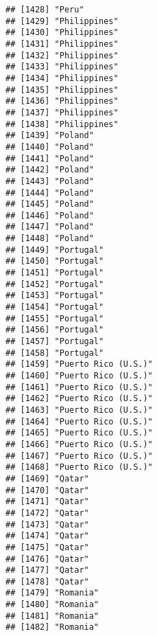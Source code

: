 \documentclass[]{article}
\begin{document}
\begin{verbatim}
## [1428] "Peru"                               
## [1429] "Philippines"                        
## [1430] "Philippines"                        
## [1431] "Philippines"                        
## [1432] "Philippines"                        
## [1433] "Philippines"                        
## [1434] "Philippines"                        
## [1435] "Philippines"                        
## [1436] "Philippines"                        
## [1437] "Philippines"                        
## [1438] "Philippines"                        
## [1439] "Poland"                             
## [1440] "Poland"                             
## [1441] "Poland"                             
## [1442] "Poland"                             
## [1443] "Poland"                             
## [1444] "Poland"                             
## [1445] "Poland"                             
## [1446] "Poland"                             
## [1447] "Poland"                             
## [1448] "Poland"                             
## [1449] "Portugal"                           
## [1450] "Portugal"                           
## [1451] "Portugal"                           
## [1452] "Portugal"                           
## [1453] "Portugal"                           
## [1454] "Portugal"                           
## [1455] "Portugal"                           
## [1456] "Portugal"                           
## [1457] "Portugal"                           
## [1458] "Portugal"                           
## [1459] "Puerto Rico (U.S.)"                 
## [1460] "Puerto Rico (U.S.)"                 
## [1461] "Puerto Rico (U.S.)"                 
## [1462] "Puerto Rico (U.S.)"                 
## [1463] "Puerto Rico (U.S.)"                 
## [1464] "Puerto Rico (U.S.)"                 
## [1465] "Puerto Rico (U.S.)"                 
## [1466] "Puerto Rico (U.S.)"                 
## [1467] "Puerto Rico (U.S.)"                 
## [1468] "Puerto Rico (U.S.)"                 
## [1469] "Qatar"                              
## [1470] "Qatar"                              
## [1471] "Qatar"                              
## [1472] "Qatar"                              
## [1473] "Qatar"                              
## [1474] "Qatar"                              
## [1475] "Qatar"                              
## [1476] "Qatar"                              
## [1477] "Qatar"                              
## [1478] "Qatar"                              
## [1479] "Romania"                            
## [1480] "Romania"                            
## [1481] "Romania"                            
## [1482] "Romania"                            

\end{verbatim}
\end{document}
